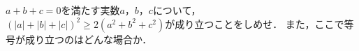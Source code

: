\documentclass[../../main.tex]{subfiles}
\begin{document}
$a+b+c=0$を満たす実数$a$，$b$，$c$について，$(|a|+|b|+|c|)^2\ge 2(a^2+b^2+c^2)$が成り立つことをしめせ．
また，ここで等号が成り立つのはどんな場合か．
\end{document}
